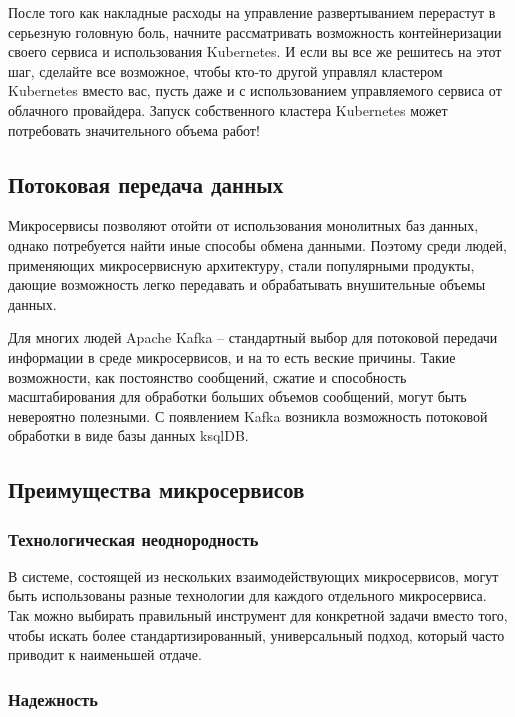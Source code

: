 \documentclass[%
	11pt,
	a4paper,
	utf8,
		]{article}
\begin{document}
После того как накладные расходы на управление развертыванием перерастут в серьезную головную боль, начните рассматривать возможность контейнеризации своего сервиса и использования Kubernetes. И если вы все же решитесь на этот шаг, сделайте все возможное, чтобы кто-то другой управлял кластером Kubernetes вместо вас, пусть даже и с использованием управляемого сервиса от облачного провайдера. Запуск собственного кластера Kubernetes может потребовать значительного объема работ!

\subsection{Потоковая передача данных}

Микросервисы позволяют отойти от использования монолитных баз данных, однако потребуется найти иные способы обмена данными. Поэтому среди людей, применяющих микросервисную архитектуру, стали популярными продукты, дающие возможность легко передавать и обрабатывать внушительные объемы данных.

Для многих людей Apache Kafka -- стандартный выбор для потоковой передачи информации в среде микросервисов, и на то есть веские причины. Такие возможности, как постоянство сообщений, сжатие и способность масштабирования для обработки больших объемов сообщений, могут быть невероятно полезными. С появлением Kafka возникла возможность потоковой обработки в виде базы данных ksqlDB.

\subsection{Преимущества микросервисов}

\subsubsection{Технологическая неоднородность}

В системе, состоящей из нескольких взаимодействующих микросервисов, могут быть использованы разные технологии для каждого отдельного микросервиса. Так можно выбирать правильный инструмент для конкретной задачи вместо того, чтобы искать более стандартизированный, универсальный подход, который часто приводит к наименьшей отдаче.

\subsubsection{Надежность}
\end{document}
